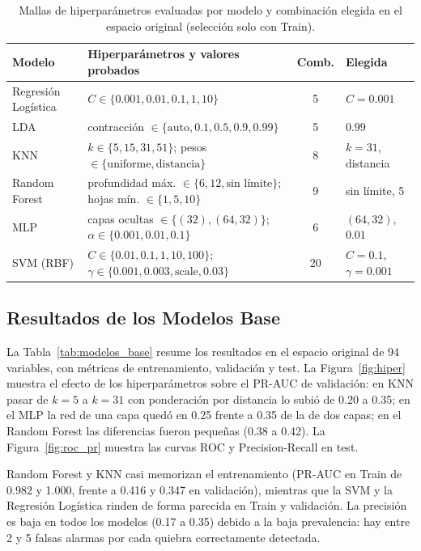 \documentclass[journal]{IEEEtran}
\begin{document}
\begin{table}[!tbp]
\centering
\caption{Mallas de hiperparámetros evaluadas por modelo y combinación elegida en el espacio original (selección solo con Train).}
\label{tab:mallas}
\begin{tabular}{llcl}
\toprule
\textbf{Modelo} & \textbf{Hiperparámetros y valores probados} & \textbf{Comb.} & \textbf{Elegida} \\
\midrule
Regresión Logística & $C \in \{0.001, 0.01, 0.1, 1, 10\}$ & 5 & $C=0.001$ \\
LDA & contracción $\in \{\text{auto}, 0.1, 0.5, 0.9, 0.99\}$ & 5 & $0.99$ \\
KNN & $k \in \{5, 15, 31, 51\}$; pesos $\in \{\text{uniforme}, \text{distancia}\}$ & 8 & $k=31$, distancia \\
Random Forest & profundidad máx. $\in \{6, 12, \text{sin límite}\}$; hojas mín. $\in \{1, 5, 10\}$ & 9 & sin límite, 5 \\
MLP & capas ocultas $\in \{(32), (64,32)\}$; $\alpha \in \{0.001, 0.01, 0.1\}$ & 6 & $(64,32)$, $0.01$ \\
SVM (RBF) & $C \in \{0.01, 0.1, 1, 10, 100\}$; $\gamma \in \{0.001, 0.003, \text{scale}, 0.03\}$ & 20 & $C=0.1$, $\gamma=0.001$ \\
\bottomrule
\end{tabular}
\end{table}

\subsection{Resultados de los Modelos Base}
La Tabla~\ref{tab:modelos_base} resume los resultados en el espacio original de 94 variables, con métricas de entrenamiento, validación y test. La Figura~\ref{fig:hiper} muestra el efecto de los hiperparámetros sobre el PR-AUC de validación: en KNN pasar de $k=5$ a $k=31$ con ponderación por distancia lo subió de 0.20 a 0.35; en el MLP la red de una capa quedó en 0.25 frente a 0.35 de la de dos capas; en el Random Forest las diferencias fueron pequeñas (0.38 a 0.42). La Figura~\ref{fig:roc_pr} muestra las curvas ROC y Precision-Recall en test.

Random Forest y KNN casi memorizan el entrenamiento (PR-AUC en Train de 0.982 y 1.000, frente a 0.416 y 0.347 en validación), mientras que la SVM y la Regresión Logística rinden de forma parecida en Train y validación. La precisión es baja en todos los modelos (0.17 a 0.35) debido a la baja prevalencia: hay entre 2 y 5 falsas alarmas por cada quiebra correctamente detectada.
\end{document}
